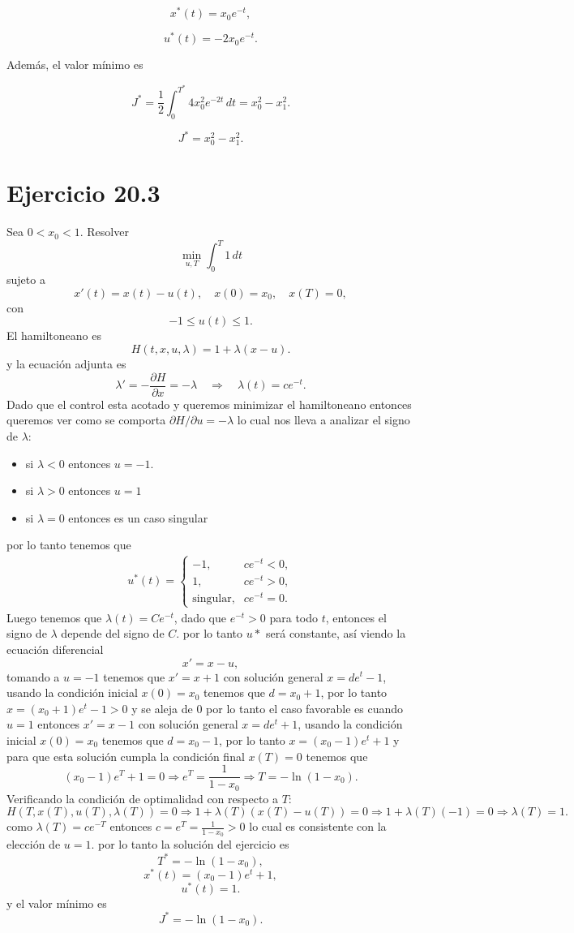 \documentclass{uofa-eng-assignment}
\begin{document}
\[
x^{*}(t)=x_{0}e^{-t},
\]

\[
u^{*}(t)=-2x_{0}e^{-t}.
\]

Además, el valor mínimo es

\[
J^{*}
=\frac{1}{2}\int_{0}^{T^{*}}4x_{0}^{2}e^{-2t}\,dt
=x_{0}^{2}-x_{1}^{2}.
\]

\[
J^{*}=x_{0}^{2}-x_{1}^{2}.
\]
\section*{Ejercicio 20.3}
Sea $0 < x_0 < 1$. Resolver
\[
\min_{u,T} \int_0^T 1 \, dt
\]
sujeto a
\[
x'(t) = x(t) - u(t), \quad x(0) = x_0, \quad x(T) = 0,
\]
con
\[
-1 \le u(t) \le 1.
\]
El hamiltoneano es
\[
H(t,x,u,\lambda) = 1 + \lambda (x-u).
\]
y la ecuación adjunta es
\[
\lambda' = -\frac{\partial H}{\partial x} = -\lambda \quad \Rightarrow \quad \lambda(t) = ce^{-t}.
\]
Dado que el control esta acotado y queremos minimizar el hamiltoneano entonces queremos ver como se comporta $\partial H/\partial u= -\lambda$ lo cual
nos lleva a analizar el signo de $\lambda$:
\begin{itemize}
    \item si $\lambda < 0$ entonces $u=-1$.
    \item si $\lambda > 0$ entonces $u= 1$
    \item si $\lambda = 0$ entonces es un caso singular
\end{itemize} 
por lo tanto tenemos que
\begin{align*}
    u^*(t) = \begin{cases}
    -1, & c e^{-t} < 0,\\
    1, & c e^{-t} > 0,\\
    \text{singular}, & c e^{-t} = 0.
    \end{cases}
\end{align*}
Luego tenemos que  $\lambda (t) = C e^{-t}$, dado que $e^{-t} >0$ para todo $t$, entonces el signo de $\lambda$ depende del signo de $C$.
por lo tanto $u*$ será constante, así viendo la ecuación diferencial
\[
x' = x-u,
\]
tomando a $u = -1 $ tenemos que $x' = x+1$ con solución general $x = de^t -1$, usando la condición inicial $x(0)=x_0$ tenemos que $d=x_0+1$, por lo tanto $x = (x_0+1)e^t -1 > 0 $ 
y se aleja de $0$ por lo tanto el caso favorable es cuando $u=1$ entonces $x' = x-1$ con solución general $x = de^t +1$, usando la condición inicial $x(0)=x_0$ tenemos que $d=x_0-1$, por lo tanto $x = (x_0-1)e^t +1$ y para que esta solución cumpla la condición final $x(T)=0$ tenemos que
\[ 
(x_0-1)e^T +1 = 0 \Rightarrow e^T = \frac{1}{1-x_0} \Rightarrow T = -\ln(1-x_0).
\]
Verificando la condición de optimalidad con respecto a $T$:
\[
H(T, x(T), u(T), \lambda(T)) = 0 \Rightarrow 1 + \lambda(T)(x(T)-u(T)) = 0 \Rightarrow 1 + \lambda(T)(-1) = 0 \Rightarrow \lambda(T) = 1.
\]
como $\lambda(T) = ce^{-T}$ entonces $c = e^T = \frac{1}{1-x_0} > 0$ lo cual es consistente con la elección de $u=1$.
por lo tanto la solución del ejercicio es
\[T^* = -\ln(1-x_0),
\]
\[
x^*(t) = (x_0-1)e^t + 1,   
\]
\[
u^*(t) = 1.
\]
y el valor mínimo es
\[J^* = -\ln(1-x_0). \]
\end{document}
